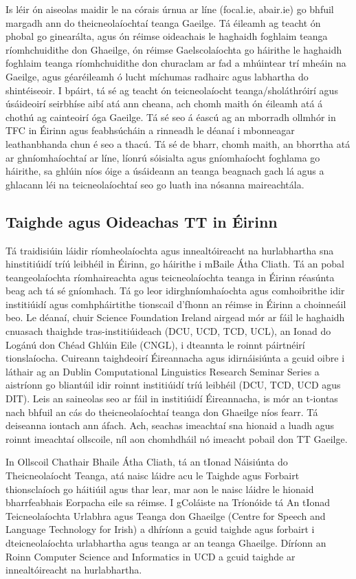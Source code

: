 \begin{multicols}{2}
Is léir ón aiseolas maidir le na córais úrnua ar líne (focal.ie, abair.ie) go bhfuil margadh ann do theicneolaíochtaí teanga Gaeilge. Tá éileamh ag teacht ón phobal go ginearálta, agus ón réimse oideachais le haghaidh foghlaim teanga ríomhchuidithe don Ghaeilge, ón réimse Gaelscolaíochta go háirithe le haghaidh foghlaim teanga ríomhchuidithe don churaclam ar fad a mhúintear trí mheáin na Gaeilge, agus géaréileamh ó lucht míchumas radhairc agus labhartha do shintéiseoir. I bpáirt, tá sé ag teacht ón teicneolaíocht teanga/sholáthróirí agus úsáideoirí seirbhíse aibí atá ann cheana, ach chomh maith ón éileamh atá á chothú ag cainteoirí óga Gaeilge. Tá sé seo á éascú ag an mborradh ollmhór in TFC in Éirinn agus feabhsúcháin a rinneadh le déanaí i mbonneagar leathanbhanda chun é seo a thacú. Tá sé de bharr, chomh maith, an bhorrtha atá ar ghníomhaíochtaí ar líne, líonrú sóisialta agus gníomhaíocht foghlama go háirithe, sa ghlúin níos óige a úsáideann an teanga beagnach gach lá agus a ghlacann léi na teicneolaíochtaí seo go luath ina nósanna maireachtála.


\subsection{Taighde agus Oideachas TT in Éirinn}

Tá traidisiúin láidir ríomheolaíochta agus innealtóireacht na hurlabhartha sna hinstitiúidí tríú leibhéil in Éirinn, go háirithe i mBaile Átha Cliath. Tá an pobal teangeolaíochta ríomhaireachta agus teicneolaíochta teanga in Éirinn réasúnta beag ach tá sé gníomhach. Tá go leor idirghníomhaíochta agus comhoibrithe idir institiúidí agus comhpháirtithe tionscail d'fhonn an réimse in Éirinn a choinneáil beo. Le déanaí, chuir Science Foundation Ireland airgead mór ar fáil le haghaidh cnuasach thaighde tras-institiúideach (DCU, UCD, TCD, UCL), an Ionad do Logánú don Chéad Ghlúin Eile (CNGL), i  dteannta le roinnt páirtnéirí tionslaíocha. Cuireann taighdeoirí Éireannacha agus idirnáisiúnta a gcuid oibre i láthair ag an Dublin Computational Linguistics Research Seminar Series a aistríonn go bliantúil idir roinnt institiúidí tríú leibhéil (DCU, TCD, UCD agus DIT). Leis an saineolas seo ar fáil in institiúidí Éireannacha, is mór an t-iontas nach bhfuil an cás do theicneolaíochtaí teanga don Ghaeilge níos fearr. Tá deiseanna iontach ann áfach. Ach, seachas imeachtaí sna hionaid a luadh agus roinnt imeachtaí ollscoile, níl aon chomhdháil nó imeacht pobail don TT Gaeilge.

In Ollscoil Chathair Bhaile Átha Cliath, tá an tIonad Náisiúnta do Theicneolaíocht Teanga, atá naisc láidre acu le Taighde agus Forbairt thionsclaíoch go háitiúil agus thar lear, mar aon le naisc láidre le hionaid bharrfeabhais Eorpacha eile sa réimse. I gColáiste na Tríonóide tá An tIonad Teicneolaíochta Urlabhra agus Teanga don Ghaeilge (Centre for Speech and Language Technology for Irish) a dhíríonn a gcuid taighde agus forbairt i dteicneolaíochta urlabhartha agus teanga ar an teanga Ghaeilge. Díríonn an Roinn Computer Science and Informatics in UCD a gcuid taighde ar innealtóireacht na hurlabhartha.



\end{multicols}
